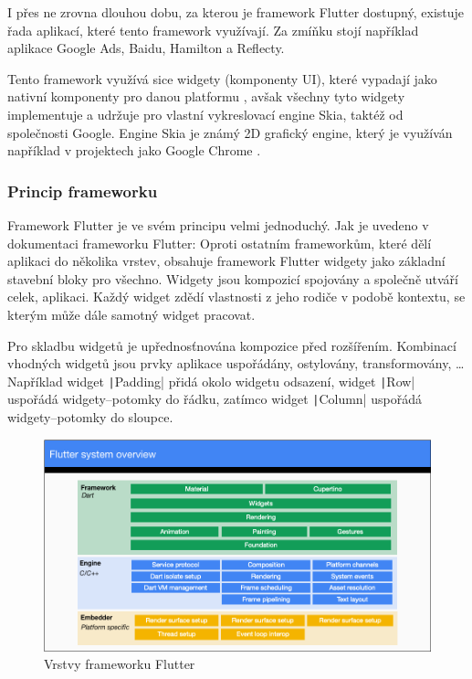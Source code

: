 I přes ne zrovna dlouhou dobu,
za kterou je framework Flutter dostupný,
existuje řada aplikací,
které tento framework využívají.
Za zmíňku stojí například aplikace Google Ads, Baidu, Hamilton a Reflecty.
\cite{flutter}

Tento framework využívá sice widgety (komponenty UI),
které vypadají jako nativní komponenty pro danou platformu \cite{flutter},
avšak všechny tyto widgety implementuje a udržuje pro vlastní vykreslovací
engine Skia,
taktéž od společnosti Google.
Engine Skia je známý 2D grafický engine,
který je využíván například v projektech jako Google Chrome \cite{skia}.

\subsubsection*{Princip frameworku }

Framework Flutter je ve svém principu velmi jednoduchý.
Jak je uvedeno v dokumentaci frameworku Flutter:
 \cite{flutter_technical_overview}
Oproti ostatním frameworkům,
které dělí aplikaci do několika vrstev,
obsahuje framework Flutter widgety jako základní stavební bloky pro všechno.
Widgety jsou kompozicí spojovány a společně utváří celek, aplikaci.
Každý widget zdědí vlastnosti z jeho rodiče v podobě kontextu,
se kterým může dále samotný widget pracovat.
\cite{flutter_technical_overview}

Pro skladbu widgetů je upřednosťnována kompozice před rozšířením.
Kombinací vhodných widgetů jsou prvky aplikace uspořádány, ostylovány,
transformovány, \dots{}
Například widget \texttt|Padding| přidá okolo widgetu odsazení,
widget \texttt|Row| uspořádá widgety--potomky do řádku,
zatímco widget \texttt|Column| uspořádá widgety--potomky do sloupce.
\cite{flutter_technical_overview}

\begin{figure}[ht!]
    \centering
    \includegraphics[width=\linewidth]{assets/technology-research/framework/flutter_overview.png}
    \caption{Vrstvy frameworku Flutter  \cite{flutter_technical_overview}}
    \label{fig:flutter_layers}
\end{figure}

